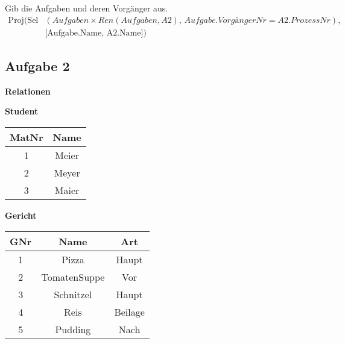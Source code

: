     Gib die Aufgaben und deren Vorgänger aus.
    \begin{align*}
        \text{Proj}\bigl(
        \text{Sel}&(Aufgaben \times Ren(Aufgaben, A2),\, Aufgabe.VorgängerNr = A2.ProzessNr),\, \\
        &\text{[Aufgabe.Name, A2.Name]}
        \bigr)
    \end{align*}

\subsection{Aufgabe 2}
\begin{table}[H]
    \scriptsize
    \centering
    \textbf{Relationen} \\ [10pt]
    \begin{minipage}[t]{0.2\textwidth}
        \centering
        \textbf{Student} \\[3pt]
        \begin{tabular}{|c|c|}
            \hline
            \textbf{MatNr} & \textbf{Name} \\
            \hline
            1 & Meier \\
            2 & Meyer \\
            3 & Maier \\
            \hline
        \end{tabular}
    \end{minipage}
    \hspace{0.2cm}
    \begin{minipage}[t]{0.3\textwidth}
        \centering
        \textbf{Gericht} \\ [3pt]
        \begin{tabular}{|c|c|c|}
            \hline
            \textbf{GNr} & \textbf{Name} & \textbf{Art} \\
            \hline
            1 & Pizza            & Haupt \\
            2 & TomatenSuppe     & Vor \\
            3 & Schnitzel        & Haupt \\
            4 & Reis             & Beilage \\
            5 & Pudding          & Nach \\
            \hline
        \end{tabular}
    \end{minipage}
    \hspace{0.2cm}
    \begin{minipage}[t]{0.3\textwidth}

\end{minipage}
\end{table}

